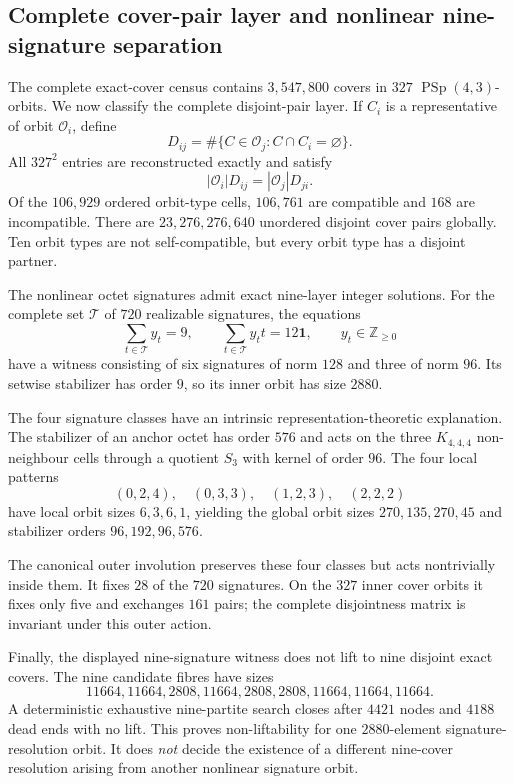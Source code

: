 \subsection{Complete cover-pair layer and nonlinear nine-signature separation}
\label{sec:complete-cover-pair-signature-separation}

The complete exact-cover census contains $3{,}547{,}800$ covers in $327$
$\operatorname{PSp}(4,3)$-orbits.  We now classify the complete disjoint-pair
layer.  If $C_i$ is a representative of orbit $\mathcal O_i$, define
\[
 D_{ij}=\#\{C\in\mathcal O_j:C\cap C_i=\varnothing\}.
\]
All $327^2$ entries are reconstructed exactly and satisfy
\[
 |\mathcal O_i|D_{ij}=|\mathcal O_j|D_{ji}.
\]
Of the $106{,}929$ ordered orbit-type cells, $106{,}761$ are compatible and
$168$ are incompatible.  There are $23{,}276{,}276{,}640$ unordered disjoint
cover pairs globally.  Ten orbit types are not self-compatible, but every orbit
type has a disjoint partner.

The nonlinear octet signatures admit exact nine-layer integer solutions.  For
the complete set $\mathcal T$ of $720$ realizable signatures, the equations
\[
 \sum_{t\in\mathcal T}y_t=9,
 \qquad
 \sum_{t\in\mathcal T}y_t t=12\mathbf 1,
 \qquad y_t\in\mathbb Z_{\ge0}
\]
have a witness consisting of six signatures of norm $128$ and three of norm
$96$.  Its setwise stabilizer has order $9$, so its inner orbit has size
$2880$.

The four signature classes have an intrinsic representation-theoretic
explanation.  The stabilizer of an anchor octet has order $576$ and acts on the
three $K_{4,4,4}$ non-neighbour cells through a quotient $S_3$ with kernel of
order $96$.  The four local patterns
\[
 (0,2,4),\quad(0,3,3),\quad(1,2,3),\quad(2,2,2)
\]
have local orbit sizes $6,3,6,1$, yielding the global orbit sizes
$270,135,270,45$ and stabilizer orders $96,192,96,576$.

The canonical outer involution preserves these four classes but acts
nontrivially inside them.  It fixes $28$ of the $720$ signatures.  On the $327$
inner cover orbits it fixes only five and exchanges $161$ pairs; the complete
disjointness matrix is invariant under this outer action.

Finally, the displayed nine-signature witness does not lift to nine disjoint
exact covers.  The nine candidate fibres have sizes
\[
 11664,11664,2808,11664,2808,2808,11664,11664,11664.
\]
A deterministic exhaustive nine-partite search closes after $4421$ nodes and
$4188$ dead ends with no lift.  This proves non-liftability for one
$2880$-element signature-resolution orbit.  It does \emph{not} decide the
existence of a different nine-cover resolution arising from another nonlinear
signature orbit.
